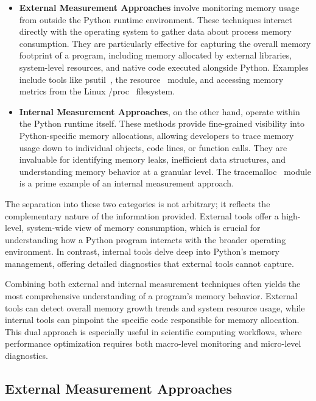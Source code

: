 \begin{itemize}
    \item \textbf{External Measurement Approaches}
    involve monitoring memory usage from outside the Python runtime environment.
    These techniques interact directly with the operating system to gather data about process memory consumption.
    They are particularly effective for capturing the overall memory footprint of a program, including memory allocated by external libraries, system-level resources, and native code executed alongside Python.
    Examples include tools like psutil~\cite{psutil}, the resource~\cite{importlib_resources} module, and accessing memory metrics from the Linux /proc~\cite{procfs} filesystem.

    \item \textbf{Internal Measurement Approaches},
    on the other hand, operate within the Python runtime itself.
    These methods provide fine-grained visibility into Python-specific memory allocations, allowing developers to trace memory usage down to individual objects, code lines, or function calls.
    They are invaluable for identifying memory leaks, inefficient data structures, and understanding memory behavior at a granular level.
    The tracemalloc~\cite{tracemalloc} module is a prime example of an internal measurement approach.
\end{itemize}

The separation into these two categories is not arbitrary; it reflects the complementary nature of the information provided.
External tools offer a high-level, system-wide view of memory consumption, which is crucial for understanding how a Python program interacts with the broader operating environment.
In contrast, internal tools delve deep into Python’s memory management, offering detailed diagnostics that external tools cannot capture.

Combining both external and internal measurement techniques often yields the most comprehensive understanding of a program’s memory behavior.
External tools can detect overall memory growth trends and system resource usage, while internal tools can pinpoint the specific code responsible for memory allocation.
This dual approach is especially useful in scientific computing workflows, where performance optimization requires both macro-level monitoring and micro-level diagnostics.

\subsection{External Measurement Approaches}

